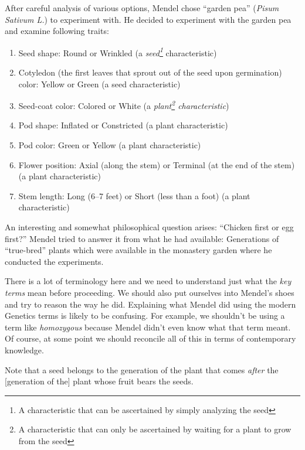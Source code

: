 \documentclass[12pt]{article}
\begin{document}
After careful analysis of various options, Mendel chose ``garden pea'' (\emph{Pisum Sativum L.}) to experiment with. He decided to experiment with the garden pea and examine following traits:
\begin{enumerate}
    \item Seed shape: Round or Wrinkled (a \emph{seed\footnote{A characteristic that can be ascertained by simply analyzing the seed}} characteristic)
    \item Cotyledon (the first leaves that sprout out of the seed upon germination) color: Yellow or Green (a seed characteristic)
    \item Seed-coat color: Colored or White (a \emph{plant\footnote{A characteristic that can only be ascertained by waiting for a plant to grow from the seed} characteristic})
    \item Pod shape: Inflated or Constricted (a plant characteristic)
    \item Pod color: Green or Yellow (a plant characteristic)
    \item Flower position: Axial (along the stem) or Terminal (at the end of the stem) (a plant characteristic)
    \item Stem length: Long (6--7 feet) or Short (less than a foot) (a plant characteristic)
\end{enumerate}

An interesting and somewhat philosophical question arises: ``Chicken first or egg first?'' Mendel tried to answer it from what he had available: Generations of ``true-bred'' plants which were available in the monastery garden where he conducted the experiments. 

There is a lot of terminology here and we need to understand just what the \emph{key terms} mean before proceeding. We should also put ourselves into Mendel's shoes and try to reason the way he did. Explaining what Mendel did using the modern Genetics terms is likely to be confusing. For example, we shouldn't be using a term like \emph{homozygous} because Mendel didn't even know what that term meant. Of course, at some point we should reconcile all of this in terms of contemporary knowledge. 

Note that a seed belongs to the generation of the plant that comes \emph{after} the [generation of the] plant whose fruit bears the seeds.
\end{document}
